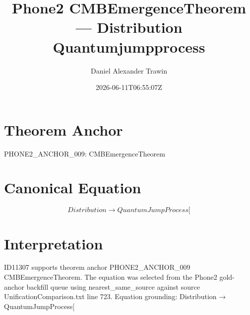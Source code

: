 \documentclass[11pt]{article}
\title{Phone2 CMBEmergenceTheorem — Distribution Quantumjumpprocess}
\author{Daniel Alexander Trawin}
\date{2026-06-11T06:55:07Z}
\begin{document}
\maketitle
\section*{Theorem Anchor}
PHONE2_ANCHOR_009: CMBEmergenceTheorem
\section*{Canonical Equation}
\[
Distribution → QuantumJumpProcess[
\]
\section*{Interpretation}
ID11307 supports theorem anchor PHONE2_ANCHOR_009 CMBEmergenceTheorem. The equation was selected from the Phone2 gold-anchor backfill queue using nearest_same_source against source UnificationComparison.txt line 723. Equation grounding: Distribution → QuantumJumpProcess[
\end{document}
